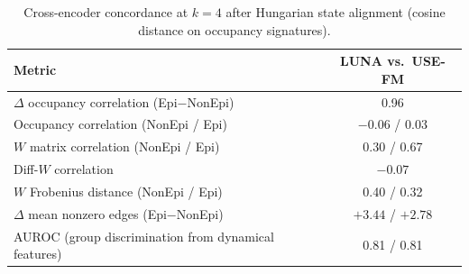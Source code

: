 \begin{table}[t]
\centering
\caption{Cross-encoder concordance at $k=4$ after Hungarian state alignment
(cosine distance on occupancy signatures).}
\label{tab:concordance}
\setlength{\tabcolsep}{6pt}
\renewcommand{\arraystretch}{1.12}
\begin{tabular}{lc}
\toprule
Metric & LUNA vs.\ USE-FM \\
\midrule
$\Delta$ occupancy correlation (Epi$-$NonEpi) & 0.96 \\
Occupancy correlation (NonEpi / Epi) & $-0.06$ / 0.03 \\
$W$ matrix correlation (NonEpi / Epi) & 0.30 / 0.67 \\
Diff-$W$ correlation & $-0.07$ \\
$W$ Frobenius distance (NonEpi / Epi) & 0.40 / 0.32 \\
$\Delta$ mean nonzero edges (Epi$-$NonEpi) & $+3.44$ / $+2.78$ \\
AUROC (group discrimination from dynamical features) & 0.81 / 0.81 \\
\bottomrule
\end{tabular}
\end{table}

